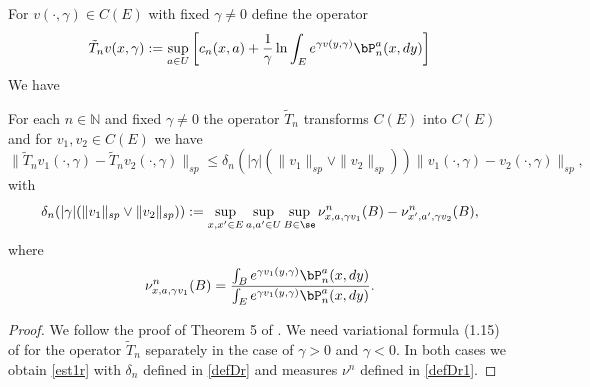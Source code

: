 \documentclass[10pt,english]{extarticle}
\begin{document}
For $v(\cdot,\gamma)\in C(E)$ with fixed $\gamma\neq 0$ define the operator
\begin{equation}\label{Optr}
\tilde{T}_n v(x,\gamma):= \sup_{a\in U} \left[c_n(x,a)+{1\over \gamma}\ln\int_E e^{\gamma v(y,\gamma)}\bP_n^a(x,dy)\right]
\end{equation}
We have
\begin{lemma}\label{loccon}
For each $n\in \mathbb{N}$ and fixed $\gamma\neq 0$ the operator $\tilde{T}_n$ transforms $C(E)$ into $C(E)$ and for $v_1,v_2\in C(E)$ we have
\begin{equation}\label{est1r}
\|\tilde{T}_n v_1(\cdot,\gamma) - \tilde{T}_nv_2(\cdot,\gamma)\|_{sp}\leq \delta_n(|\gamma|(\|v_1\|_{sp}\vee \|v_2\|_{sp})) \|v_1(\cdot,\gamma)-v_2(\cdot,\gamma)\|_{sp},
\end{equation}
with
\begin{equation}\label{defDr}
\delta_n(|\gamma|(\|v_1\|_{sp}\vee \|v_2\|_{sp})):=\sup_{x,x'\in E} \sup_{a,a'\in U} \sup_{B\in \se} \nu_{x,a,\gamma v_1}^n(B)-\nu_{x',a',\gamma v_2}^n(B),
\end{equation}
where
\begin{equation}\label{defDr1}
\nu_{x,a,\gamma v_1}^n(B)={\int_B e^{\gamma v_1(y,\gamma)}\bP_n^a(x,dy) \over \int_E e^{\gamma v_1(y,\gamma)}\bP_n^a(x,dy)}.
\end{equation}
\end{lemma}
\begin{proof}
We follow the proof of Theorem 5 of \cite{Ste2023}. We need variational formula (1.15) of \cite{Dupuis}  for the operator $\tilde{T}_n$ separately in the case of $\gamma>0 $ and $\gamma<0$. In both cases we obtain \eqref{est1r} with $\delta_n$ defined in \eqref{defDr} and measures $\nu^n$ defined in \eqref{defDr1}.
\end{proof}
\end{document}
